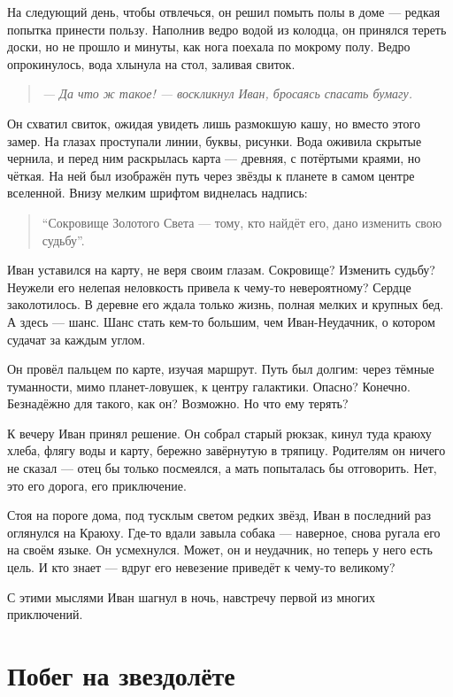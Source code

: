\documentclass[12pt,a4paper]{book}
\newenvironment{dialogue}{\begin{quote}\itshape}{\end{quote}}
\begin{document}
На следующий день, чтобы отвлечься, он решил помыть полы в доме --- редкая попытка принести пользу. Наполнив ведро водой из колодца, он принялся тереть доски, но не прошло и минуты, как нога поехала по мокрому полу. Ведро опрокинулось, вода хлынула на стол, заливая свиток.

\begin{dialogue}
--- Да что ж такое! --- воскликнул Иван, бросаясь спасать бумагу.
\end{dialogue}

Он схватил свиток, ожидая увидеть лишь размокшую кашу, но вместо этого замер. На глазах проступали линии, буквы, рисунки. Вода оживила скрытые чернила, и перед ним раскрылась карта --- древняя, с потёртыми краями, но чёткая. На ней был изображён путь через звёзды к планете в самом центре вселенной. Внизу мелким шрифтом виднелась надпись:

\begin{quote}
``Сокровище Золотого Света --- тому, кто найдёт его, дано изменить свою судьбу''.
\end{quote}

Иван уставился на карту, не веря своим глазам. Сокровище? Изменить судьбу? Неужели его нелепая неловкость привела к чему-то невероятному? Сердце заколотилось. В деревне его ждала только жизнь, полная мелких и крупных бед. А здесь --- шанс. Шанс стать кем-то большим, чем Иван-Неудачник, о котором судачат за каждым углом.

Он провёл пальцем по карте, изучая маршрут. Путь был долгим: через тёмные туманности, мимо планет-ловушек, к центру галактики. Опасно? Конечно. Безнадёжно для такого, как он? Возможно. Но что ему терять?

К вечеру Иван принял решение. Он собрал старый рюкзак, кинул туда краюху хлеба, флягу воды и карту, бережно завёрнутую в тряпицу. Родителям он ничего не сказал --- отец бы только посмеялся, а мать попыталась бы отговорить. Нет, это его дорога, его приключение.

Стоя на пороге дома, под тусклым светом редких звёзд, Иван в последний раз оглянулся на Краюху. Где-то вдали завыла собака --- наверное, снова ругала его на своём языке. Он усмехнулся. Может, он и неудачник, но теперь у него есть цель. И кто знает --- вдруг его невезение приведёт к чему-то великому?

С этими мыслями Иван шагнул в ночь, навстречу первой из многих приключений.

\chapter{Побег на звездолёте}
\end{document}
